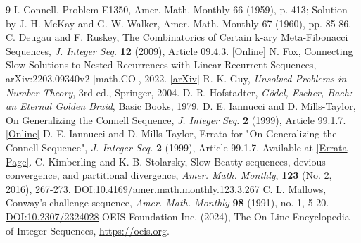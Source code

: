 \documentclass[11pt,a4paper]{article} %
\theoremstyle{remark}
\begin{document}
\begin{thebibliography}{9}
 I. Connell, Problem E1350, Amer. Math. Monthly 66 (1959), p. 413; Solution by J. H. McKay and G. W. Walker, Amer. Math. Monthly 67 (1960), pp. 85-86.
 C. Deugau and F. Ruskey, The Combinatorics of Certain k-ary Meta-Fibonacci Sequences, \textit{J. Integer Seq.} \textbf{12} (2009), Article 09.4.3. \href{https://cs.uwaterloo.ca/journals/JIS/VOL12/Ruskey/ruskey6.html}{[Online]}
 N. Fox, Connecting Slow Solutions to Nested Recurrences with Linear Recurrent Sequences, arXiv:2203.09340v2 [math.CO], 2022. \href{https://arxiv.org/abs/2203.09340}{[arXiv]}
 R. K. Guy, \textit{Unsolved Problems in Number Theory}, 3rd ed., Springer, 2004.
 D. R. Hofstadter, \textit{Gödel, Escher, Bach: an Eternal Golden Braid}, Basic Books, 1979.
 D. E. Iannucci and D. Mills-Taylor, On Generalizing the Connell Sequence, \textit{J. Integer Seq.} \textbf{2} (1999), Article 99.1.7. \href{https://cs.uwaterloo.ca/journals/JIS/VOL2/Iannucci/iann1.html}{[Online]}
 D. E. Iannucci and D. Mills-Taylor, Errata for "On Generalizing the Connell Sequence", \textit{J. Integer Seq.} \textbf{2} (1999), Article 99.1.7. Available at \href{https://cs.uwaterloo.ca/journals/JIS/ERRATA/iann1.html}{[Errata Page]}.
 C. Kimberling and K. B. Stolarsky, Slow Beatty sequences, devious convergence, and partitional divergence, \textit{Amer. Math. Monthly}, \textbf{123} (No. 2, 2016), 267-273. \href{https://doi.org/10.4169/amer.math.monthly.123.3.267}{DOI:10.4169/amer.math.monthly.123.3.267}
 C. L. Mallows, Conway's challenge sequence, \textit{Amer. Math. Monthly} \textbf{98} (1991), no. 1, 5-20. \href{https://doi.org/10.2307/2324028}{DOI:10.2307/2324028}
 OEIS Foundation Inc. (2024), The On-Line Encyclopedia of Integer Sequences, \url{https://oeis.org}.
\end{thebibliography}
\end{document}

